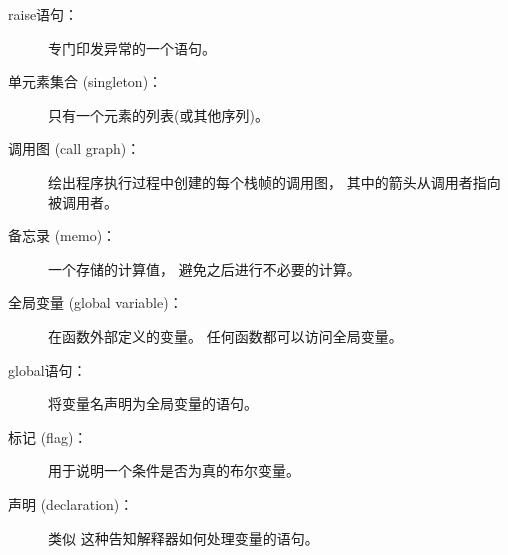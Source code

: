 \begin{description}
\item[raise语句：]  专门印发异常的一个语句。

  


\item[单元素集合 (singleton)：] 只有一个元素的列表(或其他序列)。


\item[调用图 (call graph)：] 绘出程序执行过程中创建的每个栈帧的调用图， 其中的箭头从调用者指向被调用者。

  


\item[备忘录 (memo)：] 一个存储的计算值， 避免之后进行不必要的计算。



\item[全局变量 (global variable)：]  在函数外部定义的变量。  任何函数都可以访问全局变量。



\item[global语句：]  将变量名声明为全局变量的语句。

  


\item[标记 (flag)：] 用于说明一个条件是否为真的布尔变量。



\item[声明 (declaration)：] 类似  这种告知解释器如何处理变量的语句。


\end{description}
